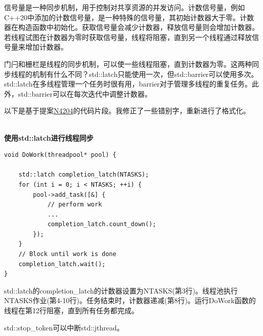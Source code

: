
信号量是一种同步机制，用于控制对共享资源的并发访问。计数信号量，例如C++20中添加的计数信号量，是一种特殊的信号量，其初始计数器大于零。计数器在构造函数中初始化。获取信号量会减少计数器，释放信号量则会增加计数器。若线程试图在计数器为零时获取信号量，线程将阻塞，直到另一个线程通过释放信号量来增加计数器。



门闩和栅栏是线程的同步机制，可以使一些线程阻塞，直到计数器为零。这两种同步线程的机制有什么不同？std::latch只能使用一次，但std::barrier可以使用多次。std::latch在多线程管理一个任务时很有用，barrier对于管理多线程的重复任务。此外，std::barrier可以在每次迭代中调整计数器。

以下是基于提案\href{http://www.open-std.org/jtc1/sc22/wg21/docs/papers/2014/n4204.html}{N4204}的代码片段。我修正了一些错别字，重新进行了格式化。

\hspace*{\fill} \\ %
\noindent
\textbf{使用std::latch进行线程同步}
\begin{lstlisting}[style=styleCXX]
void DoWork(threadpool* pool) {

	std::latch completion_latch(NTASKS);
	for (int i = 0; i < NTASKS; ++i) {
		pool->add_task([&] {
			// perform work
			...
			completion_latch.count_down();
		});
	}
	// Block until work is done
	completion_latch.wait();
}
\end{lstlisting}

std::latch的completion\_latch的计数器设置为NTASKS(第3行)。线程池执行NTASKS作业(第4-10行)。任务结束时，计数器递减(第8行)。运行DoWork函数的线程在第12行阻塞，直到所有任务都完成。


std::stop\_token可以中断std::jthread。

